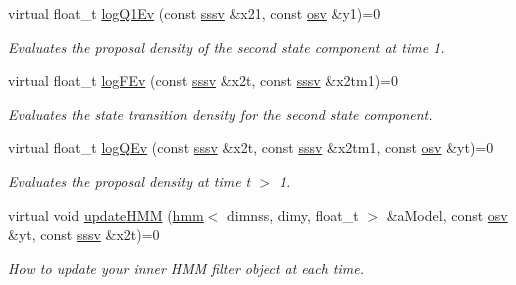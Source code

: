 \begin{DoxyCompactItemize}
virtual float\+\_\+t \hyperlink{classrbpf__hmm_a7200983bf6acdbffaab91bec3e980a81}{log\+Q1\+Ev} (const \hyperlink{classrbpf__hmm_a28e8ad1d93bcf53cb74603f74826a81c}{sssv} \&x21, const \hyperlink{classrbpf__hmm_adafd37687fdd3bb776d3d33a5b0e7080}{osv} \&y1)=0
\begin{DoxyCompactList}\small\item\em Evaluates the proposal density of the second state component at time 1. \end{DoxyCompactList}\item 
virtual float\+\_\+t \hyperlink{classrbpf__hmm_a4ae74e05f31f74d26be47da29fc0ed96}{log\+F\+Ev} (const \hyperlink{classrbpf__hmm_a28e8ad1d93bcf53cb74603f74826a81c}{sssv} \&x2t, const \hyperlink{classrbpf__hmm_a28e8ad1d93bcf53cb74603f74826a81c}{sssv} \&x2tm1)=0
\begin{DoxyCompactList}\small\item\em Evaluates the state transition density for the second state component. \end{DoxyCompactList}\item 
virtual float\+\_\+t \hyperlink{classrbpf__hmm_a79dfd2e1b728f16c6d20269452ff3531}{log\+Q\+Ev} (const \hyperlink{classrbpf__hmm_a28e8ad1d93bcf53cb74603f74826a81c}{sssv} \&x2t, const \hyperlink{classrbpf__hmm_a28e8ad1d93bcf53cb74603f74826a81c}{sssv} \&x2tm1, const \hyperlink{classrbpf__hmm_adafd37687fdd3bb776d3d33a5b0e7080}{osv} \&yt)=0
\begin{DoxyCompactList}\small\item\em Evaluates the proposal density at time t $>$ 1. \end{DoxyCompactList}\item 
virtual void \hyperlink{classrbpf__hmm_ae91a14844119ab697bbbec93ed30972b}{update\+H\+MM} (\hyperlink{classhmm}{hmm}$<$ dimnss, dimy, float\+\_\+t $>$ \&a\+Model, const \hyperlink{classrbpf__hmm_adafd37687fdd3bb776d3d33a5b0e7080}{osv} \&yt, const \hyperlink{classrbpf__hmm_a28e8ad1d93bcf53cb74603f74826a81c}{sssv} \&x2t)=0
\begin{DoxyCompactList}\small\item\em How to update your inner H\+MM filter object at each time. \end{DoxyCompactList}\end{DoxyCompactItemize}
